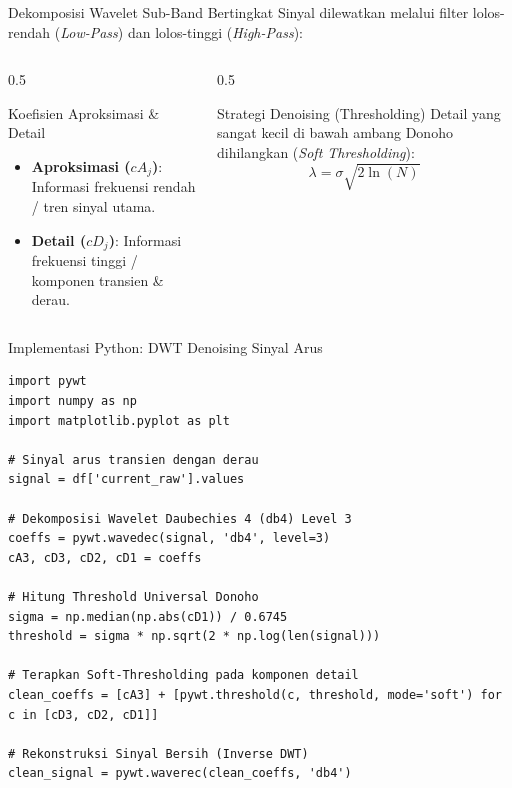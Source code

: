 \documentclass[aspectratio=169, 10pt]{beamer}
\begin{document}
\begin{frame}{Dekomposisi Wavelet Sub-Band Bertingkat}
    Sinyal dilewatkan melalui filter lolos-rendah (\textit{Low-Pass}) dan lolos-tinggi (\textit{High-Pass}):
    \begin{columns}[T]
        \begin{column}{0.5\textwidth}
            \begin{block}{Koefisien Aproksimasi \& Detail}
                \begin{itemize}
                    \item \textbf{Aproksimasi ($cA_j$)}: Informasi frekuensi rendah / tren sinyal utama.
                    \item \textbf{Detail ($cD_j$)}: Informasi frekuensi tinggi / komponen transien \& derau.
                \end{itemize}
            \end{block}
        \end{column}
        \begin{column}{0.5\textwidth}
            \begin{block}{Strategi Denoising (Thresholding)}
                Detail yang sangat kecil di bawah ambang Donoho dihilangkan (\textit{Soft Thresholding}):
                \begin{equation}
                    \lambda = \sigma \sqrt{2 \ln(N)}
                \end{equation}
            \end{block}
        \end{column}
    \end{columns}
\end{frame}

\begin{frame}[fragile]{Implementasi Python: DWT Denoising Sinyal Arus}
\begin{lstlisting}
import pywt
import numpy as np
import matplotlib.pyplot as plt

# Sinyal arus transien dengan derau
signal = df['current_raw'].values

# Dekomposisi Wavelet Daubechies 4 (db4) Level 3
coeffs = pywt.wavedec(signal, 'db4', level=3)
cA3, cD3, cD2, cD1 = coeffs

# Hitung Threshold Universal Donoho
sigma = np.median(np.abs(cD1)) / 0.6745
threshold = sigma * np.sqrt(2 * np.log(len(signal)))

# Terapkan Soft-Thresholding pada komponen detail
clean_coeffs = [cA3] + [pywt.threshold(c, threshold, mode='soft') for c in [cD3, cD2, cD1]]

# Rekonstruksi Sinyal Bersih (Inverse DWT)
clean_signal = pywt.waverec(clean_coeffs, 'db4')
\end{lstlisting}
\end{frame}
\end{document}

